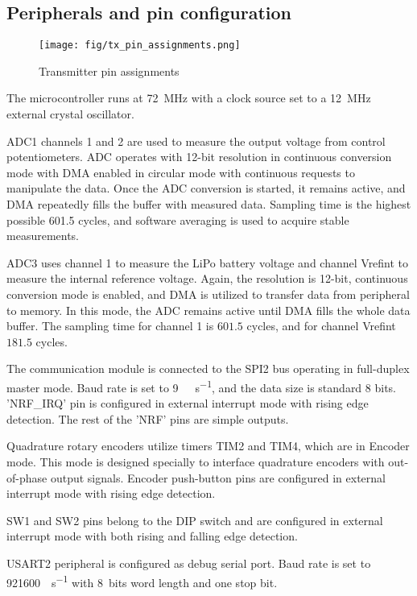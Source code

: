\subsection{Peripherals and pin configuration}
\label{sub:tx_conf}
\begin{figure}[h]
\centering
\texttt{[image: fig/tx\_pin\_assignments.png]}
\caption{Transmitter pin assignments}
\label{fig:tx_conf}
\end{figure}
\noindent
The microcontroller runs at \SI{72}{\MHz} with a clock source set to a \SI{12}{\MHz} external crystal oscillator.

ADC1 channels 1 and 2 are used to measure the output voltage from control potentiometers. ADC operates with 12-bit resolution in continuous conversion mode with DMA enabled in circular mode with continuous requests to manipulate the data. Once the ADC conversion is started, it remains active, and DMA repeatedly fills the buffer with measured data. Sampling time is the highest possible 601.5 cycles, and software averaging is used to acquire stable measurements.

ADC3 uses channel 1 to measure the LiPo battery voltage and channel Vrefint to measure the internal reference voltage. Again, the resolution is 12-bit, continuous conversion mode is enabled, and DMA is utilized to transfer data from peripheral to memory. In this mode, the ADC remains active until DMA fills the whole data buffer. The sampling time for channel 1 is $601.5$ cycles, and for channel Vrefint $181.5$ cycles.

The communication module is connected to the SPI2 bus operating in full-duplex master mode. Baud rate is set to \SI{9}{\mega\bit\per\second}, and the data size is standard 8 bits. 'NRF\_IRQ' pin is configured in external interrupt mode with rising edge detection. The rest of the 'NRF' pins are simple outputs.

Quadrature rotary encoders utilize timers TIM2 and TIM4, which are in Encoder mode. This mode is designed specially to interface quadrature encoders with out-of-phase output signals. Encoder push-button pins are configured in external interrupt mode with rising edge detection.

SW1 and SW2 pins belong to the DIP switch and are configured in external interrupt mode with both rising and falling edge detection.

USART2 peripheral is configured as debug serial port. Baud rate is set to \SI{921600}{\bit\per\second} with 8~bits word length and one stop bit.

